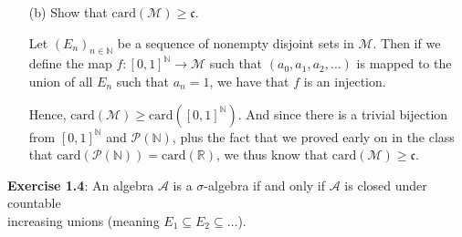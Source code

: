 \documentclass{book}
\newcommand{\exTwoP}{%
   \color{RedViolet}%
   \fontsize{13}{15}\selectfont%
}
\newenvironment{myIndent}{%
   \begin{adjustwidth}{2.5em}{0em}%
}{%
   \end{adjustwidth}%
}
\newcommand{\blab}[1]{\textbf{#1}}
\newcommand{\card}{\mathrm{card}}
\newcommand{\retTwo}{\hfill\bigbreak}
\begin{document}
\begin{itemize}
\begin{myIndent}
      Note that since $E_{k-1} \cap B$ is a set in $\mathcal{M}$, we must have that $(E_k - E_{k-1}) \not\subseteq B$ or else $B$ would be the union of $(E_k - E_{k-1})$ and a set from $\mathcal{M}$. Thus, we know $E_k$ contains points that neither $B$ nor $E_{k-1}$ have. At the same time, we know $B$ has points that $E_{k-1}$ doesn't have. It follows that: $E_{k-1} \subset E_{k-1} \cup B \subset E_k$. \retTwo

      Via transitivity, $E_{k-1} \cup B$ is comparable via proper subset with $E_i$ for all\\ $i \in \{1, \ldots, n\}$. Hence, we've shown that $\mathcal{S} \cup \{E_{k-1} \cup B\}$ is a sequence of sets in $\mathcal{M}$ simply ordered by proper subset. But this contradicts that $\mathcal{S}$ is maximal.\retTwo

      Now that we know $\mathcal{S}$ is infinite, let $(E_n)_{n \in \mathbb{Z}_+}$ be a sequence of sets in $\mathcal{S}$\\ satisfying that $E_n \subset E_{n + 1}$. Then we have that $(E_{n+1} - E_n)_{n \in \mathbb{Z}_+}$ is an infinite\\ sequence of nonempty disjoint sets in $\mathcal{M}$.\retTwo
   \end{myIndent}

   \item[(b)] Show that $\card(\mathcal{M}) \geq \mathfrak{c}$.
   
   \begin{myIndent}\exTwoP
      Let $(E_n)_{n \in \mathbb{N}}$ be a sequence of nonempty disjoint sets in $\mathcal{M}$. Then if we\\ [2pt] define the map $f: [0, 1]^\mathbb{N} \longrightarrow \mathcal{M}$ such that $(a_0, a_1, a_2, \ldots)$ is mapped to the\\ [2pt]  union of all $E_n$ such that $a_n = 1$, we have that $f$ is an injection.\retTwo

      Hence, $\card(\mathcal{M}) \geq \card([0, 1]^{\mathbb{N}})$. And since there is a trivial bijection\\ from $[0, 1]^{\mathbb{N}}$ and $\mathcal{P}(\mathbb{N})$, plus the fact that we proved early on in the class\\ that $\card(\mathcal{P}(\mathbb{N})) = \card(\mathbb{R})$, we thus know that $\card(\mathcal{M}) \geq \mathfrak{c}$.\newpage
   \end{myIndent}
\end{itemize}

\blab{Exercise 1.4}: An algebra $\mathcal{A}$ is a $\sigma$-algebra if and only if $\mathcal{A}$ is closed under countable\\ increasing unions (meaning $E_1 \subseteq E_2 \subseteq \ldots$).
\end{document}
